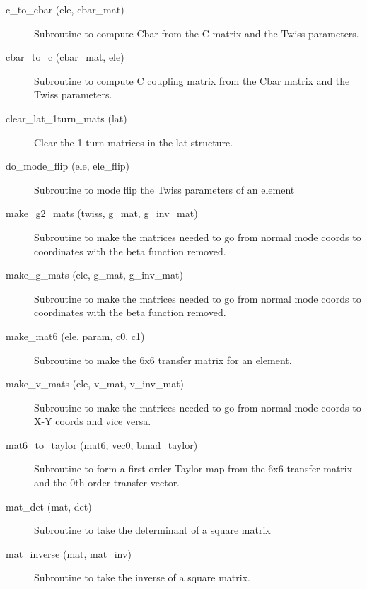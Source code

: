 \begin{description}

\item[c_to_cbar (ele, cbar_mat)] \Newline
Subroutine to compute Cbar from the C matrix and the Twiss parameters. 

\item[cbar_to_c (cbar_mat, ele)] \Newline
Subroutine to compute C coupling matrix from the Cbar matrix and the Twiss parameters. 

\item[clear_lat_1turn_mats (lat)] \Newline
Clear the 1-turn matrices in the lat structure. 

\item[do_mode_flip (ele, ele_flip)] \Newline
Subroutine to mode flip the Twiss parameters of an element 

\item[make_g2_mats (twiss, g_mat, g_inv_mat)] \Newline
Subroutine to make the matrices needed to go from normal mode coords to 
coordinates with the beta function removed. 

\item[make_g_mats (ele, g_mat, g_inv_mat)] \Newline
Subroutine to make the matrices needed to go from normal mode coords to 
coordinates with the beta function removed. 

\item[make_mat6 (ele, param, c0, c1)] \Newline
Subroutine to make the 6x6 transfer matrix for an element. 

\item[make_v_mats (ele, v_mat, v_inv_mat)] \Newline
Subroutine to make the matrices needed to go from normal mode coords to X-Y 
coords and vice versa. 

\item[mat6_to_taylor (mat6, vec0, bmad_taylor)] \Newline
Subroutine to form a first order Taylor map from the 6x6 transfer matrix 
and the 0th order transfer vector. 

\item[mat_det (mat, det)] \Newline 
     Subroutine to take the determinant of a square matrix

\item[mat_inverse (mat, mat_inv)] \Newline
Subroutine to take the inverse of a square matrix. 


\end{description}
